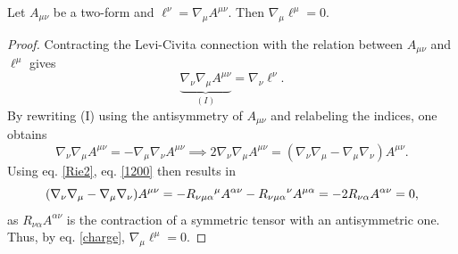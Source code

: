 \documentclass[
12pt,		%
openright,	%
twoside,  %
a4paper,			%
chapter=TITLE,		%
english,			%
french,				%
spanish,			%
brazil				%
]{USPSC-classe/USPSC}
\begin{document}
\begin{proposition}\label{PropKomar}
Let $A_{\mu\nu}$ be a two-form and $\ell^{\nu}=\nabla_{\mu}A^{\mu\nu}$. Then $\nabla_{\mu}\ell^{\mu}=0$.
\end{proposition}
\begin{proof}
Contracting the Levi-Civita connection with the relation between $A_{\mu\nu}$ and $\ell^{\mu}$ gives
\begin{equation}\label{charge}
    \underbrace{\nabla_{\nu}\nabla_{\mu}A^{\mu\nu}}_{(I)}=\nabla_{\nu}\ell^{\nu}.
\end{equation}
By rewriting (I) using the antisymmetry of $A_{\mu\nu}$ and relabeling the indices, one obtains
\begin{equation}\label{1200}
    \nabla_{\nu}\nabla_{\mu}A^{\mu\nu}=-\nabla_{\mu}\nabla_{\nu}A^{\mu\nu}\implies 2\nabla_{\nu}\nabla_{\mu}A^{\mu\nu}=(\nabla_{\nu}\nabla_{\mu}-\nabla_{\mu}\nabla_{\nu})A^{\mu\nu}.
\end{equation}
Using eq. \ref{Rie2}, eq. \ref{1200} then results in
\begin{equation}
    (\nabla_{\nu}\nabla_{\mu}-\nabla_{\mu}\nabla_{\nu})A^{\mu\nu}=-R_{\nu\mu\alpha}\mathstrut^{\mu}A^{\alpha\nu}-R_{\nu\mu\alpha}\mathstrut^{\nu}A^{\mu\alpha}=-2R_{\nu\alpha}A^{\alpha\nu}=0,
\end{equation}
as $R_{\nu\alpha}A^{\alpha\nu}$ is the contraction of a symmetric tensor with an antisymmetric one. Thus, by eq. \ref{charge}, $\nabla_{\mu}\ell^{\mu}=0$.
\end{proof}
\end{document}
